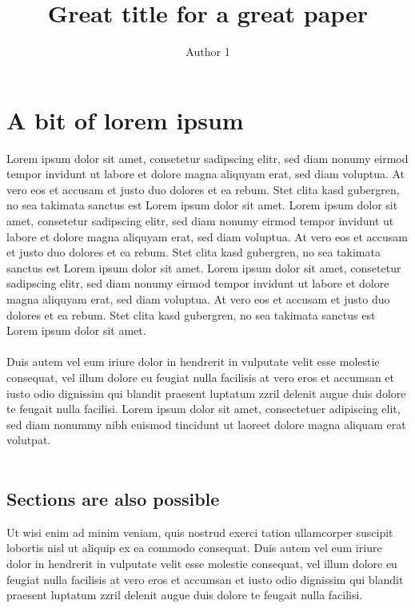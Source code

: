 \documentclass[bibliography=totoc,listof=totoc,BCOR=5mm,DIV=12,oneside]{scrbook}
\title{Great title for a great paper}
\author{Author 1}
\begin{document}
\maketitle
\tableofcontents

\chapter{A bit of lorem ipsum}

Lorem ipsum dolor sit amet, consetetur sadipscing elitr, sed diam nonumy eirmod tempor invidunt ut labore et dolore magna aliquyam erat, sed diam voluptua. At vero eos et accusam et justo duo dolores et ea rebum. Stet clita kasd gubergren, no sea takimata sanctus est Lorem ipsum dolor sit amet. Lorem ipsum dolor sit amet, consetetur sadipscing elitr, sed diam nonumy eirmod tempor invidunt ut labore et dolore magna aliquyam erat, sed diam voluptua. At vero eos et accusam et justo duo dolores et ea rebum. Stet clita kasd gubergren, no sea takimata sanctus est Lorem ipsum dolor sit amet. Lorem ipsum dolor sit amet, consetetur sadipscing elitr, sed diam nonumy eirmod tempor invidunt ut labore et dolore magna aliquyam erat, sed diam voluptua. At vero eos et accusam et justo duo dolores et ea rebum. Stet clita kasd gubergren, no sea takimata sanctus est Lorem ipsum dolor sit amet.\\\\   

Duis autem vel eum iriure dolor in hendrerit in vulputate velit esse molestie consequat, vel illum dolore eu feugiat nulla facilisis at vero eros et accumsan et iusto odio dignissim qui blandit praesent luptatum zzril delenit augue duis dolore te feugait nulla facilisi. Lorem ipsum dolor sit amet, consectetuer adipiscing elit, sed diam nonummy nibh euismod tincidunt ut laoreet dolore magna aliquam erat volutpat.\\\\   

\section{Sections are also possible}

Ut wisi enim ad minim veniam, quis nostrud exerci tation ullamcorper suscipit lobortis nisl ut aliquip ex ea commodo consequat. Duis autem vel eum iriure dolor in hendrerit in vulputate velit esse molestie consequat, vel illum dolore eu feugiat nulla facilisis at vero eros et accumsan et iusto odio dignissim qui blandit praesent luptatum zzril delenit augue duis dolore te feugait nulla facilisi.\\\\   
\end{document}
